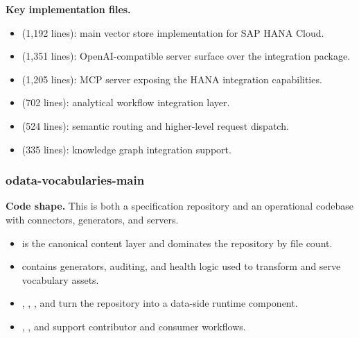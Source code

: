 \documentclass[11pt,a4paper]{article}
\begin{document}
\textbf{Key implementation files.}
\begin{itemize}[leftmargin=*]
    \item {} (1,192 lines): main vector store implementation for SAP HANA Cloud.
    \item {} (1,351 lines): OpenAI-compatible server surface over the integration package.
    \item {} (1,205 lines): MCP server exposing the HANA integration capabilities.
    \item {} (702 lines): analytical workflow integration layer.
    \item {} (524 lines): semantic routing and higher-level request dispatch.
    \item {} (335 lines): knowledge graph integration support.
\end{itemize}

\subsubsection{odata-vocabularies-main}

\textbf{Code shape.} This is both a specification repository and an operational codebase with connectors, generators, and servers.
\begin{itemize}[leftmargin=*]
    \item {} is the canonical content layer and dominates the repository by file count.
    \item {} contains generators, auditing, and health logic used to transform and serve vocabulary assets.
    \item {}, , , and  turn the repository into a data-side runtime component.
    \item {}, , and  support contributor and consumer workflows.
\end{itemize}
\end{document}
